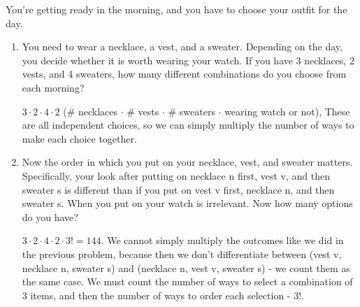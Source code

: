 \question 
\vspace{2 mm}
You're getting ready in the morning, and you have to choose your outfit for the day.
\begin{enumerate}[label=(\alph*)]
\item
You need to wear a necklace, a vest, and a sweater. Depending on the day, you decide whether it is worth wearing your watch. If you have 3 necklaces, 2 vests, and 4 sweaters, how many different combinations do you choose from each morning?

\begin{solution}[.3 in]
$3 \cdot 2 \cdot 4  \cdot 2 $ (\# necklaces $\cdot$ \# vests  $\cdot$ \# sweaters $\cdot$ wearing watch or not), 
These are all independent choices, so we can simply multiply the number of ways to make each choice together.
\end{solution}

\item Now the order in which you put on your necklace, vest, and sweater matters. Specifically, your look after putting on necklace n first, vest v, and then sweater s is different than if you put on vest v first, necklace n, and then sweater s. When you put on your watch is irrelevant. Now how many options do you have?

\begin{solution} [0.3 in]
$3 \cdot 2 \cdot 4  \cdot 2 \cdot 3! = 144$. We cannot simply multiply the outcomes like we did in the previous problem, because then we don't differentiate between (vest v, necklace n, sweater s) and (necklace n, vest v, sweater s) - we count them as the same case. We must count the number of ways to select a combination of 3 items, and then the number of ways to order each selection - 3!. 
\end{solution}

\end{enumerate}